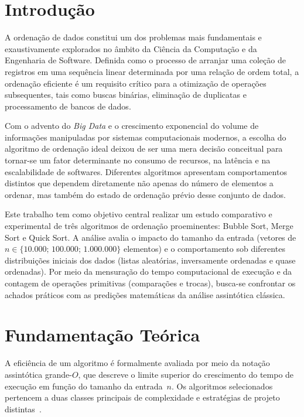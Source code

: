 \documentclass[12pt]{article}
\begin{document}
\section{Introdução}

A ordenação de dados constitui um dos problemas mais fundamentais e
exaustivamente explorados no âmbito da Ciência da Computação e da Engenharia
de Software. Definida como o processo de arranjar uma coleção de registros em
uma sequência linear determinada por uma relação de ordem total, a ordenação
eficiente é um requisito crítico para a otimização de operações subsequentes,
tais como buscas binárias, eliminação de duplicatas e processamento de bancos
de dados.

Com o advento do \textit{Big Data} e o crescimento exponencial do volume de
informações manipuladas por sistemas computacionais modernos, a escolha do
algoritmo de ordenação ideal deixou de ser uma mera decisão conceitual para
tornar-se um fator determinante no consumo de recursos, na latência e na
escalabilidade de softwares. Diferentes algoritmos apresentam comportamentos
distintos que dependem diretamente não apenas do número de elementos a
ordenar, mas também do estado de ordenação prévio desse conjunto de dados.

Este trabalho tem como objetivo central realizar um estudo comparativo e
experimental de três algoritmos de ordenação proeminentes: Bubble Sort, Merge
Sort e Quick Sort. A análise avalia o impacto do tamanho da entrada (vetores
de $n \in \{10.000;\, 100.000;\, 1.000.000\}$ elementos) e o comportamento
sob diferentes distribuições iniciais dos dados (listas aleatórias,
inversamente ordenadas e quase ordenadas). Por meio da mensuração do tempo
computacional de execução e da contagem de operações primitivas (comparações
e trocas), busca-se confrontar os achados práticos com as predições
matemáticas da análise assintótica clássica.

\section{Fundamentação Teórica}

A eficiência de um algoritmo é formalmente avaliada por meio da notação
assintótica grande-$O$, que descreve o limite superior do crescimento do
tempo de execução em função do tamanho da entrada~$n$. Os algoritmos
selecionados pertencem a duas classes principais de complexidade e estratégias
de projeto distintas~\cite{cormen,knuth}.
\end{document}
